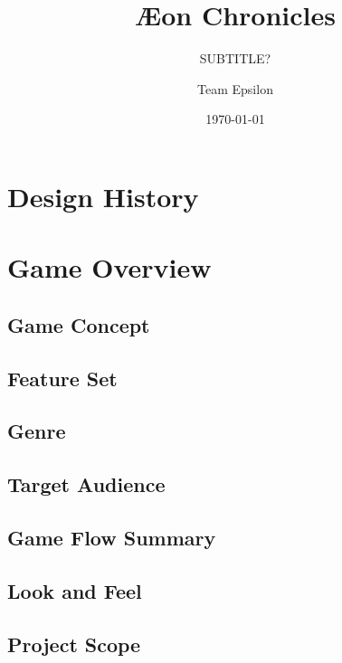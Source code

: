 \documentclass[12pt,titlepage]{article}
\title{\AE on Chronicles}
\subtitle{SUBTITLE?}
\author{Team Epsilon}
\date{\today}
\begin{document}
\maketitle

\tableofcontents


\section{Design History}

\section{Game Overview}

\subsection{Game Concept}

\subsection{Feature Set}

\subsection{Genre}

\subsection{Target Audience}

\subsection{Game Flow Summary}

\subsection{Look and Feel}

\subsection{Project Scope}
%
\end{document}
